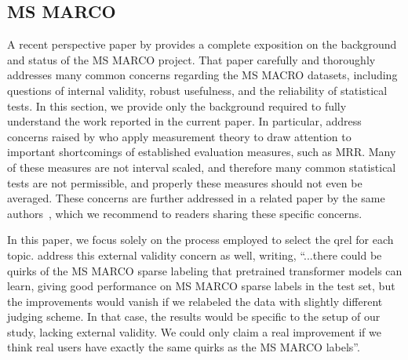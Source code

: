 \documentclass[fullpage]{article}
\begin{document}
\subsection{MS MARCO}
\label{sec:marco}
A recent perspective paper by \citet{marco21full} provides a complete exposition on the background and status of the MS MARCO project. That paper carefully and thoroughly addresses many common concerns regarding the MS MACRO datasets, including questions of internal validity, robust usefulness, and the reliability of statistical tests. In this section, we provide only the background required to fully understand the work reported in the current paper. In particular, \citet{marco21full} address concerns raised by \citet{ferrante2021meaningful} who apply measurement theory to draw attention to important shortcomings of established evaluation measures, such as MRR. Many of these measures are not interval scaled, and therefore many common statistical tests are not permissible, and properly these measures should not even be averaged. These concerns are further addressed in a related paper by the same authors~\cite{marco21short}, which we recommend to readers sharing these specific concerns.

In this paper, we focus solely on the process employed to select the qrel for each topic. \citet{marco21full} address this external validity concern as well, writing, ``...there could be quirks of the MS MARCO sparse labeling that pretrained transformer models can learn, giving good performance on MS MARCO sparse labels in the test set, but the improvements would vanish if we relabeled the data with slightly different judging scheme. In that case, the results would be specific to the setup of our study, lacking external validity. We could only claim a real improvement if we think real users have exactly the same quirks as the MS MARCO labels''.
\end{document}
